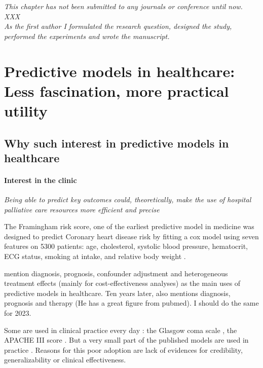 \documentclass[french,12pt,twoside,a4paper]{book}
\begin{document}
\vfill
\textit{This chapter has not been submitted to any journals or conference until
  now.\\ XXX \\
  As the first author I formulated the research question, designed the study,
  performed the experiments and wrote the manuscript.}

\clearpage
\section{Predictive models in healthcare: Less fascination, more practical utility}\label{sec:predictive_models:motivation}

\subsection{Why such interest in predictive models in healthcare}\label{subsec:predictive_models:importance}

\paragraph{Interest in the clinic}

\textit{Being able to predict key outcomes could, theoretically, make the use of
  hospital palliative care resources more efficient and precise} \citep{topol2019high}

The Framingham risk score, one of the earliest predictive model in medicine was
designed to predict Coronary heart disease risk by fitting a cox model using
seven features on 5300 patients: age, cholesterol, systolic blood pressure,
hematocrit, ECG status, smoking at intake, and relative body weight
\citep{brand1976multivariate}.

\cite{harrell2001regression} mention diagnosis, prognosis, confounder adjustment
and heterogeneous treatment effects (mainly for cost-effectiveness analyses) as
the main uses of predictive models in healthcare. Ten years later,
\cite{steyerberg2009applications} also mentions diagnosis, prognosis and therapy
(He has a great figure from pubmed). I should do the same for 2023.

Some are used in clinical practice every day : the Glasgow coma scale
\citep{teasdale1974assessment}, the APACHE III score \citep{knaus1991apache}.
But a very small part of the published models are used in practice
\citep{wyatt1995commentary}. Reasons for this poor adoption are lack of
evidences for credibility, generalizability or clinical effectiveness.
\end{document}
